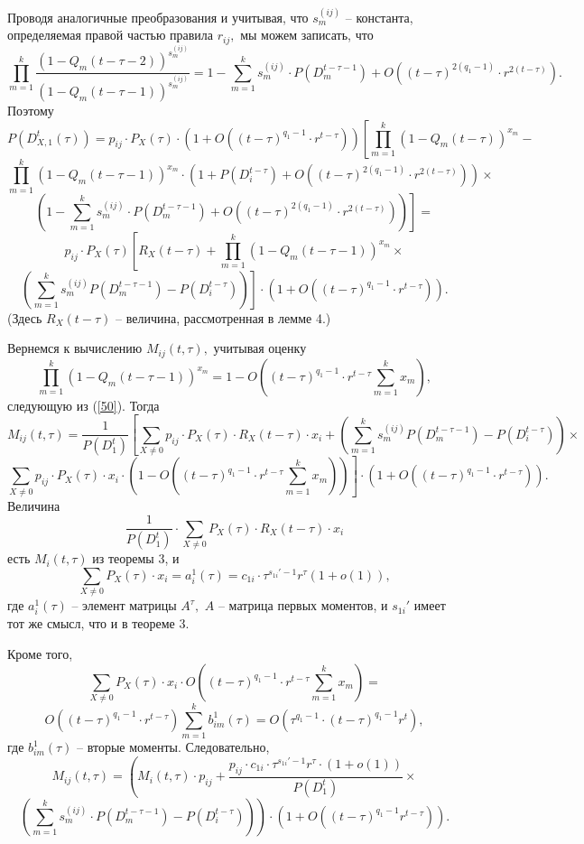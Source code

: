 \documentclass[%
11pt,a4paper]{article}
\begin{document}
{{{Проводя аналогичные преобразования и учитывая, что $s_m^{(ij)}$ -- константа,
определяемая правой частью правила $r_{ij},$ мы можем записать, что
$$
\prod_{m=1}^k \frac{(1-Q_m(t-\tau-2))^{s_m^{(ij)}}}
{(1-Q_m(t-\tau-1))^{s_m^{(ij)}}}=
1-\sum_{m=1}^k s_m^{(ij)}\cdot P\left(D_m^{t-\tau-1}\right)+
O\left((t-\tau)^{2(q_1-1)}\cdot r^{2(t-\tau)}\right).
$$
Поэтому
$$
P\left(D^t_{X,1}(\tau)\right)=
p_{ij} \cdot P_X(\tau) \cdot
\left(1+O\left((t-\tau)^{q_1-1}\cdot r^{t-\tau}\right)\right)
\left[\prod_{m=1}^k \left(1-Q_m(t-\tau)\right)^{x_m}- \right.
$$
$$
\prod_{m=1}^k \left(1-Q_m(t-\tau-1)\right)^{x_m} \cdot
\left(1+P(D_i^{t-\tau})+O((t-\tau)^{2(q_1-1)}\cdot r^{2(t-\tau)})\right) \times
$$
$$
\left.\left(1-\sum_{m=1}^k s_m^{(ij)}\cdot P\left(D_m^{t-\tau-1}\right)+
O\left((t-\tau)^{2(q_1-1)}\cdot r^{2(t-\tau)}\right)\right)\right]=
$$
$$
p_{ij} \cdot P_X(\tau) \left[ R_X(t-\tau) +
 \prod_{m=1}^k \left(1-Q_m(t-\tau-1)\right)^{x_m} \times
\right.
$$
$$
\left.\left(\sum_{m=1}^k s_m^{(ij)}P(D_m^{t-\tau-1})-P(D_i^{t-\tau}) \right)\right]
\cdot
\left(1+O\left((t-\tau)^{q_1-1}\cdot r^{t-\tau}\right)\right).
$$
(Здесь $R_X(t-\tau)$ -- величина, рассмотренная в лемме 4.)

Вернемся к вычислению $M_{ij}(t,\tau),$
учитывая оценку $$
\prod_{m=1}^k \left(1-Q_m(t-\tau-1)\right)^{x_m}=
1- O\left((t-\tau)^{q_1-1}\cdot r^{t-\tau}\sum_{m=1}^k x_m\right),
$$
следующую из (\ref{50}).
Тогда
$$
M_{ij}(t,\tau)=
\frac{1}{P(D_1^t)} \left[\sum_{X \ne 0} p_{ij} \cdot P_X(\tau) \cdot R_X(t-\tau)\cdot x_i+ \right.
\left(\sum_{m=1}^k s_m^{(ij)} P\left(D_m^{t-\tau-1}\right)-
P\left(D_i^{t-\tau}\right)\right)\times
$$
$$
\left.\sum_{X \ne 0} p_{ij} \cdot P_X(\tau) \cdot x_i
\cdot \left(1- O\left((t-\tau)^{q_1-1}\cdot r^{t-\tau}\sum_{m=1}^k x_m\right)\right)\right]\cdot
\left(1+O\left((t-\tau)^{q_1-1}\cdot r^{t-\tau}\right)\right).
$$
Величина
$$
\frac{1}{P(D_1^t)} \cdot
\sum_{X \ne 0} P_X(\tau) \cdot R_X(t-\tau)\cdot x_i
$$
есть $M_i(t,\tau)$ из теоремы 3, и
$$
\sum_{X \ne 0} P_X(\tau) \cdot x_i=
a_i^1(\tau)=c_{1i}\cdot \tau^{s_{1i}'-1}r^{\tau}(1+o(1)),
$$
где $a_i^1 (\tau)$ -- элемент матрицы $A^{\tau},$
$A$ -- матрица первых моментов, и
$s_{1i}'$ имеет тот же смысл, что и в теореме 3.

Кроме того,
$$
\sum_{X \ne 0} P_X(\tau) \cdot x_i \cdot O\left((t-\tau)^{q_1-1}\cdot r^{t-\tau}\sum_{m=1}^k x_m\right)=
$$
$$
O\left((t-\tau)^{q_1-1}\cdot r^{t-\tau}\right)\sum_{m=1}^k b^1_{im}(\tau)=
O\left(\tau^{q_1-1} \cdot (t-\tau)^{q_1-1 }r^{t}\right),
$$
где $b^1_{im}(\tau)$ -- вторые моменты.
Следовательно,
$$
M_{ij}(t,\tau)= \left(M_i(t,\tau)\cdot p_{ij} +
\frac{p_{ij} \cdot c_{1i}\cdot \tau^{s_{1i}'-1}r^{\tau}\cdot (1+o(1)) }{P(D_1^t)} \times \right.
$$
$$
\left. \left(\sum_{m=1}^k s_m^{(ij)}\cdot
P(D_m^{t-\tau-1})- P(D_i^{t-\tau}) \right)\right)
\cdot \left(1+ O\left((t-\tau)^{q_1-1} r^{t-\tau}\right)\right).
$$

}}}
\end{document}
